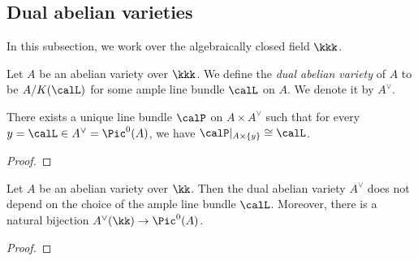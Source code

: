 

\subsection{Dual abelian varieties}

    In this subsection, we work over the algebraically closed field \(\kkk\).


    \begin{definition}\label{def:dual_abelian_variety}
        Let \(A\) be an abelian variety over \(\kkk\).
        We define the \emph{dual abelian variety} of \(A\) to be \(A/K(\calL)\) for some ample line bundle \(\calL\) on \(A\).
        We denote it by \(A^\vee\).
    \end{definition}

    \begin{proposition}\label{prop: the Poincare line bundle}
        There exists a unique line bundle \(\calP\) on \(A \times A^\vee\) such that for every \(y = \calL \in A^\vee = \Pic^0(A)\), we have \(\calP|_{A \times \{y\}} \cong \calL\).
    \end{proposition}
    \begin{proof}
    \end{proof}

    \begin{theorem}\label{thm:dual_abelian_variety_as_Pic0}
        Let $A$ be an abelian variety over $\kk$. 
        Then the dual abelian variety \(A^\vee\) does not depend on the choice of the ample line bundle \(\calL\).
        Moreover, there is a natural bijection \(A^\vee(\kk) \to \Pic^0(A)\).
    \end{theorem}
    \begin{proof}
    \end{proof}

